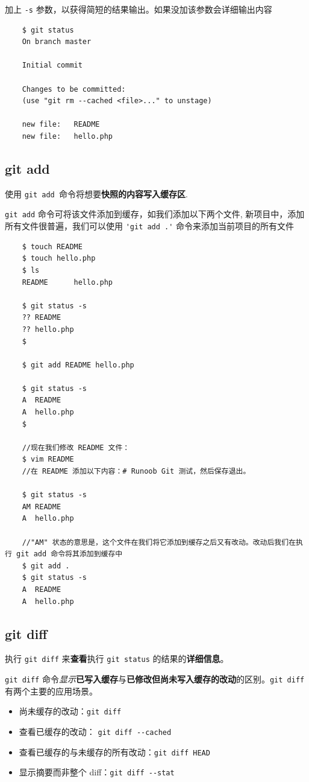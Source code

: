 \documentclass[UTF8,a4paper,12pt]{ctexbook}
\begin{document}
			  加上 \verb|-s| 参数，以获得简短的结果输出。如果没加该参数会详细输出内容
			  \begin{lstlisting}
	$ git status
	On branch master
	
	Initial commit
	
	Changes to be committed:
	(use "git rm --cached <file>..." to unstage)
	
	new file:   README
	new file:   hello.php
			  \end{lstlisting}
			  
		  \subsection{git add}
			  使用 \verb|git add |命令将想要\textbf{快照的内容写入缓存区}.
		  
			  \verb|git add| 命令可将该文件添加到缓存，如我们添加以下两个文件,	新项目中，添加所有文件很普遍，我们可以使用 \verb|'git add .'| 命令来添加当前项目的所有文件
			  \begin{lstlisting}
	$ touch README
	$ touch hello.php
	$ ls
	README		hello.php
	
	$ git status -s
	?? README
	?? hello.php
	$ 
	
	$ git add README hello.php 
	
	$ git status -s
	A  README
	A  hello.php
	$ 
	
	//现在我们修改 README 文件：
	$ vim README
	//在 README 添加以下内容：# Runoob Git 测试，然后保存退出。
	
	$ git status -s
	AM README
	A  hello.php
	
	//"AM" 状态的意思是，这个文件在我们将它添加到缓存之后又有改动。改动后我们在执行 git add 命令将其添加到缓存中
	$ git add .
	$ git status -s
	A  README
	A  hello.php
			  \end{lstlisting}
		\subsection{git diff}
			执行 \verb|git diff| 来\textbf{查看}执行 \verb|git status| 的结果的\textbf{详细信息}。
			
			\verb|git diff| 命令\textit{显示}\textbf{已写入缓存}与\textbf{已修改但尚未写入缓存的改动}的区别。\verb|git diff| 有两个主要的应用场景。
			
			\begin{itemize}
				\item 尚未缓存的改动：\verb|git diff| 
				\item 查看已缓存的改动： \verb|git diff --cached| 
				\item 查看已缓存的与未缓存的所有改动：\verb|git diff HEAD| 
				\item 显示摘要而非整个 diff：\verb|git diff --stat| 
			\end{itemize}
			
\end{document}
